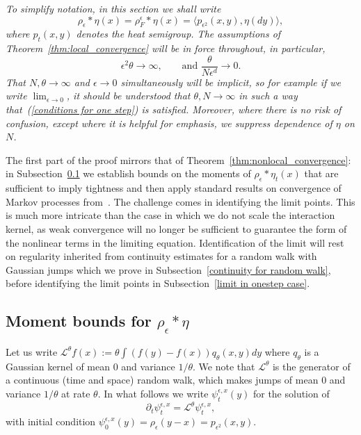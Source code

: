 \documentclass[EJP]{ejpecp} %
\begin{document}
{\em To simplify notation, in this section we shall write 
$$\rho_\epsilon*\eta(x)=\rho_F^\epsilon*\eta(x)
=\langle p_{\epsilon^2}(x,y),\eta(dy)\rangle,$$
where $p_t(x,y)$ denotes the heat semigroup. 
The assumptions of Theorem~\ref{thm:local_convergence} will be in 
force throughout, in particular, 
\begin{equation}
    \label{conditions for one step}
	\epsilon^2\theta\to\infty, \qquad\mbox{and }\frac{\theta}{N\epsilon^d}\to 0.
\end{equation}
That $N, \theta\to \infty$ and $\epsilon\to 0$ simultaneously will be 
implicit, so for example if we write $\lim_{\epsilon\to 0}$, it should be 
understood that $\theta, N\to\infty$ in such a way 
that~(\ref{conditions for one step}) is satisfied. 
Moreover, where there is no risk of confusion, except where it is helpful
for emphasis, we 
suppress dependence of $\eta$ on $N$.}

The first part of the proof mirrors that of Theorem~\ref{thm:nonlocal_convergence}:
in Subsection~\ref{bounds on rhoepsilon}
we establish bounds on the moments of $\rho_\epsilon*\eta_t(x)$ that are sufficient to
imply tightness and then apply standard results on 
convergence of Markov processes from~\cite{ethier/kurtz:1986}. 
The challenge
comes in identifying the limit points. This is much more intricate than the case in 
which we do not scale the interaction kernel, as weak convergence will no longer
be sufficient to guarantee the form of the nonlinear terms in the limiting equation.
Identification of the limit will rest on regularity inherited from continuity 
estimates for a random walk with Gaussian jumps which we prove in 
Subsection~\ref{continuity for random walk}, before
identifying the limit points in Subsection~\ref{limit in onestep case}.

\subsection{Moment bounds for $\rho_\epsilon*\eta$}
\label{bounds on rhoepsilon}

Let us write $\mathcal{L}^\theta f(x) := \theta \int (f(y)-f(x))q_\theta(x,y) dy$ 
where $q_\theta$ is a Gaussian kernel of mean $0$ and variance $1/\theta$. 
We note that $\mathcal{L}^\theta$ is the generator of a continuous (time and 
space) random walk, which makes jumps of mean $0$ and variance $1/\theta$ at rate $\theta$.
In what follows we write $\psi_t^{\epsilon, x}(y)$ for the solution of
\begin{equation}
    \partial_t \psi_t^{\epsilon,x}
    =
    \mathcal{L}^\theta \psi_t^{\epsilon, x},
    \label{AlmostHeatEquation}
\end{equation}
with initial condition 
$\psi_0^{\epsilon,x}(y) = \rho_\epsilon(y-x) =p_{\epsilon^2}(x,y)$.
\end{document}
